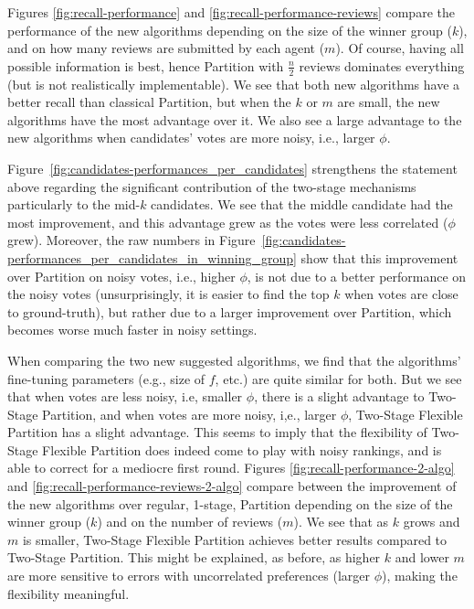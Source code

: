 \documentclass[letterpaper]{article} %
\begin{document}
Figures \ref{fig:recall-performance} and \ref{fig:recall-performance-reviews} compare the performance of the new algorithms depending on the size of the winner group ($k$), and on how many reviews are submitted by each agent ($m$). Of course, having all possible information is best, hence Partition with $\frac{n}{2}$ reviews dominates everything (but is not realistically implementable). We see that both new algorithms have a better recall than classical Partition, but when the $k$ or $m$ are small, the new algorithms have the most advantage over it. We also see a large advantage to the new algorithms when candidates' votes are more noisy, i.e., larger $\phi$.

Figure~\ref{fig:candidates-performances_per_candidates} strengthens the statement above regarding the significant contribution of the two-stage mechanisms particularly to the mid-$k$ candidates. We see that the middle candidate had the most improvement, and this advantage grew as the votes were less correlated ($\phi$ grew). Moreover, the raw numbers in Figure~\ref{fig:candidates-performances_per_candidates_in_winning_group} show that this improvement over Partition on noisy votes, i.e., higher $\phi$, is not due to a better performance on the noisy votes (unsurprisingly, it is easier to find the top $k$ when votes are close to ground-truth), but rather due to a larger improvement over Partition, which becomes worse much faster in noisy settings.

When comparing the two new suggested algorithms, we find that the algorithms' fine-tuning parameters (e.g., size of $f$, etc.) are quite similar for both. But we see that when votes are less noisy, i.e, smaller $\phi$, there is a slight advantage to Two-Stage Partition, and when votes are more noisy, i,e., larger $\phi$, Two-Stage Flexible Partition has a slight advantage. This seems to imply that the flexibility of Two-Stage Flexible Partition does indeed come to play with noisy rankings, and is able to correct for a mediocre first round. Figures \ref{fig:recall-performance-2-algo} and \ref{fig:recall-performance-reviews-2-algo} compare between the improvement of the new algorithms over regular, 1-stage, Partition depending on the size of the winner group ($k$) and on the number of reviews ($m$). We see that as $k$ grows and $m$ is smaller, Two-Stage Flexible Partition achieves better results compared to Two-Stage Partition. This might be explained, as before, as higher $k$ and lower $m$ are more sensitive to errors with uncorrelated preferences (larger $\phi$), making the flexibility meaningful.
\end{document}

